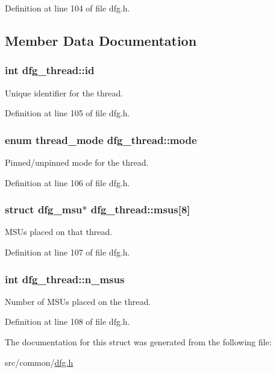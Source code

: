 Definition at line 104 of file dfg.\-h.



\subsection{Member Data Documentation}
\hypertarget{structdfg__thread_a1f44ee61a43ca981d995f3bccd2a2ae9}{
\subsubsection[{id}]{\setlength{\rightskip}{0pt plus 5cm}int dfg\-\_\-thread\-::id}}\label{structdfg__thread_a1f44ee61a43ca981d995f3bccd2a2ae9}


Unique identifier for the thread. 



Definition at line 105 of file dfg.\-h.

\hypertarget{structdfg__thread_a38d082c617509a7343088e1f6db9becd}{
\subsubsection[{mode}]{\setlength{\rightskip}{0pt plus 5cm}enum {\bf thread\-\_\-mode} dfg\-\_\-thread\-::mode}}\label{structdfg__thread_a38d082c617509a7343088e1f6db9becd}


Pinned/unpinned mode for the thread. 



Definition at line 106 of file dfg.\-h.

\hypertarget{structdfg__thread_a31973f7c62c54be9c6fb0c6ad1c7609e}{
\subsubsection[{msus}]{\setlength{\rightskip}{0pt plus 5cm}struct {\bf dfg\-\_\-msu}$\ast$ dfg\-\_\-thread\-::msus\mbox{[}8\mbox{]}}}\label{structdfg__thread_a31973f7c62c54be9c6fb0c6ad1c7609e}


M\-S\-Us placed on that thread. 



Definition at line 107 of file dfg.\-h.

\hypertarget{structdfg__thread_a2111899465e37d56cdf83654e280aa82}{
\subsubsection[{n\-\_\-msus}]{\setlength{\rightskip}{0pt plus 5cm}int dfg\-\_\-thread\-::n\-\_\-msus}}\label{structdfg__thread_a2111899465e37d56cdf83654e280aa82}


Number of M\-S\-Us placed on the thread. 



Definition at line 108 of file dfg.\-h.



The documentation for this struct was generated from the following file\-:\begin{DoxyCompactItemize}
\item 
src/common/\hyperlink{dfg_8h}{dfg.\-h}\end{DoxyCompactItemize}
